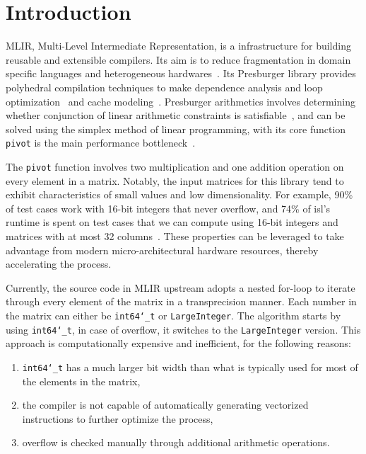 \documentclass[logo,bsc,singlespacing,parskip]{infthesis}
\newcommand{\dtlong}{\texttt{int64\char`_t}}
\newcommand{\pivot}{\texttt{pivot}}
\begin{document}
\chapter{Introduction}
\label{sec:introduction}

MLIR, Multi-Level Intermediate Representation, is a infrastructure for building
reusable and extensible compilers. Its aim is to reduce fragmentation in domain
specific languages and heterogeneous hardwares~\cite{mlir}. Its Presburger
library provides polyhedral compilation techniques to make dependence analysis
and loop optimization~\cite{mliraffine} and cache modeling~\cite{CacheModel}.
Presburger arithmetics involves determining whether conjunction of linear
arithmetic constraints is satisfiable~\cite{SMLPPA}, and can be solved using the
simplex method of linear programming, with its core function \pivot{} is the
main performance bottleneck~\cite{FPL1}. 

The \texttt{pivot} function involves two multiplication and one addition
operation on every element in a matrix. Notably, the input matrices for this
library tend to exhibit characteristics of small values and low dimensionality.
For example, 90\% of test cases work with 16-bit integers that never overflow,
and 74\% of isl’s runtime is spent on test cases that we can compute using
16-bit integers and matrices with at most 32 columns~\cite{FPL2}. These
properties can be leveraged to take advantage from modern micro-architectural
hardware resources, thereby accelerating the process.

Currently, the source code in MLIR upstream adopts a nested for-loop to iterate
through every element of the matrix in a transprecision manner. Each number in
the matrix can either be \dtlong{} or \texttt{LargeInteger}. The
algorithm starts by using \dtlong{}, in case of overflow, it switches to
the \texttt{LargeInteger} version. This approach is computationally expensive
and inefficient, for the following reasons: 
\begin{enumerate}

\item \dtlong{} has a much larger bit width than what is typically
used for most of the elements in the matrix,

\item the compiler is not capable of automatically generating vectorized
instructions to further optimize the process,

\item overflow is checked manually through additional arithmetic
operations.

\end{enumerate}
\end{document}

